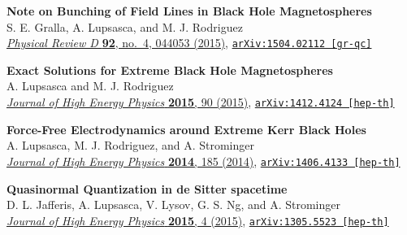 \documentclass[margin,line]{resume}
\begin{document}
\begin{resume}
\textbf{Note on Bunching of Field Lines in Black Hole Magnetospheres} \\
S. E. Gralla, A. Lupsasca, and M. J. Rodriguez \\
\href{https://doi.org/10.1103/PhysRevD.92.044053}{\textit{Physical Review D} \textbf{92}, no.~4, 044053 (2015)}, \texttt{\href{https://arxiv.org/abs/arXiv:1504.02112}{arXiv:1504.02112 [gr-qc]}}
 	
\textbf{Exact Solutions for Extreme Black Hole Magnetospheres} \\
A. Lupsasca and M. J. Rodriguez \\
\href{https://doi.org/10.1007/JHEP07(2015)090}{\textit{Journal of High Energy Physics} \textbf{2015}, 90 (2015)}, \texttt{\href{https://arxiv.org/abs/arXiv:1412.4124}{arXiv:1412.4124 [hep-th]}}

\textbf{Force-Free Electrodynamics around Extreme Kerr Black Holes} \\
A. Lupsasca, M. J. Rodriguez, and A. Strominger \\
\href{https://doi.org/10.1007/JHEP12(2014)185}{\textit{Journal of High Energy Physics} \textbf{2014}, 185 (2014)}, \texttt{\href{https://arxiv.org/abs/arXiv:1406.4133}{arXiv:1406.4133 [hep-th]}}

\textbf{Quasinormal Quantization in de Sitter spacetime} \\
D. L. Jafferis, A. Lupsasca, V. Lysov, G. S. Ng, and A. Strominger \\
\href{https://doi.org/10.1007/JHEP01(2015)004}{\textit{Journal of High Energy Physics} \textbf{2015}, 4 (2015)}, \texttt{\href{https://arxiv.org/abs/arXiv:1305.5523}{arXiv:1305.5523 [hep-th]}}

%
%
%
%

\end{resume}
\end{document}
